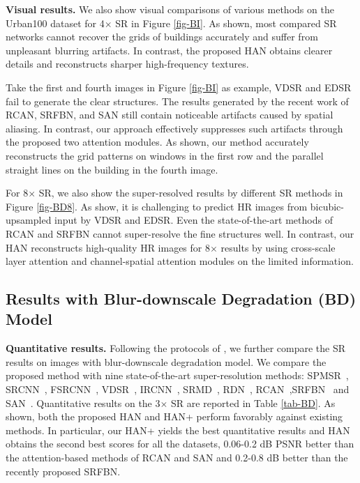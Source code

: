 \documentclass[runningheads]{llncs}
\begin{document}
\textbf{Visual results.} We also show visual comparisons of various methods on the Urban100 dataset for 4$\times$ SR in Figure \ref{fig-BI}. As shown, most compared SR networks cannot recover the grids of buildings accurately and suffer from unpleasant blurring artifacts. In contrast, the proposed HAN obtains clearer details and reconstructs sharper high-frequency textures.


Take the first and fourth images in Figure \ref{fig-BI} as example, 
VDSR and EDSR fail to generate the clear structures. The results generated by the recent work of RCAN, SRFBN, and SAN still contain noticeable artifacts caused by spatial aliasing. 
In contrast, our approach effectively suppresses such artifacts through the proposed two attention modules. As shown, our method accurately reconstructs the grid patterns on windows in the first row and the parallel straight lines on the building in the fourth image.


For 8$\times$ SR, we also show the super-resolved results by different SR methods in Figure \ref{fig-BD8}. As show, it is challenging to predict HR images from bicubic-upsampled input by VDSR and EDSR. Even the state-of-the-art methods of RCAN and SRFBN cannot super-resolve the fine structures well.
In contrast, our HAN reconstructs high-quality HR images for 8$\times$ results by using cross-scale layer attention and channel-spatial attention modules on the limited information.





\subsection{Results with Blur-downscale Degradation (BD) Model}
\noindent \textbf{Quantitative results.} Following the protocols of \cite{zhang2018learning,zhang2017learning,zhang2018residual}, we further compare the SR results on images with blur-downscale degradation model. We compare the proposed method with nine state-of-the-art super-resolution methods: SPMSR~\cite{peleg2014statistical}, SRCNN~\cite{dong2014learning}, FSRCNN~\cite{dong2016accelerating}, VDSR~\cite{kim2016accurate}, IRCNN~\cite{zhang2017learning}, SRMD~\cite{zhang2006edge}, RDN~\cite{zhang2018residual}, RCAN~\cite{zhang2018image},SRFBN~\cite{li2019feedback} and SAN~\cite{dai2019second}. Quantitative results on the 3$\times$ SR are reported in Table \ref{tab-BD}. 
As shown, both the proposed HAN and HAN+ perform favorably against existing methods. 
In particular, our HAN+ yields the best quantitative results and HAN obtains the second best scores for all the datasets, 0.06-0.2 dB PSNR better than the attention-based methods of RCAN and SAN and 0.2-0.8 dB better than the recently proposed SRFBN.
\end{document}
